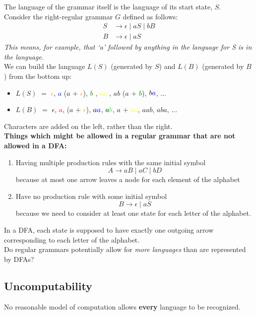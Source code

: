 \documentclass[11pt]{article}
\newcommand{\ex}[0]{\tcbhighmath[boxrule=0.5mm, colframe=pink, colback=pink, arc=10mm, size=fbox]{\textbf{Ex:}}}
\newcommand{\thm}[0]{\tcbhighmath[boxrule=0.5mm, colframe=orange!20, colback=orange!20, arc=10mm, size=fbox]{\textbf{Thm:}}}
\begin{document}
The language of the grammar itself is the language of its start state, $S$.\\

\ex Consider the right-regular grammar $G$ defined as follows:
$$
\begin{aligned}
  S &\to \epsilon \mid a S \mid b B \\
  B &\to \epsilon \mid a S
\end{aligned}
$$
\small{}\textit{This means, for example, that `a' followed by anything in the language for S is in the language.}\\  
\normalsize{}
We can build the language $L(S)$ (generated by $S$) and $L(B)$ (generated by $B$) from the bottom up:
\begin{itemize}[itemsep=-2pt]\setlength{\baselineskip}{10pt}
  \item $L(S)$ $=$ \textcolor{orange}{$\epsilon$}, \textcolor{blue}{$a$} ($a$ $+$ \textcolor{orange}{$\epsilon$}), \textcolor{green}{$b$} , \textcolor{yellow}{$aa$} , $ab$ ($a$ $+$ \textcolor{green}{$b$}), $b \textcolor{blue}{a}$, $\dots$
  \item $L(B)$ $=$ $\epsilon$, \textcolor{red}{$a$}, ($a$ $+$ \textcolor{orange}{$\epsilon$}), $a \textcolor{blue}{a}$, $a \textcolor{green}{b}$, $a$ $+$ \textcolor{yellow}{$aa$}, $aab$, $aba$, $\dots$
\end{itemize}
Characters are added on the left, rather than the right. \\

\textbf{Things which might be allowed in a regular grammar that are not allowed in a DFA:}
\begin{enumerate}
  \item Having multiple production rules with the same initial symbol
  $$
  A \to aB \mid aC \mid bD
  $$
  because at most one arrow leaves a node for each element of the alphabet
  \item Have no production rule with some initial symbol
  $$
  B \to \epsilon \mid aS
  $$
  because we need to consider at least one state for each letter of the alphabet.
\end{enumerate}
In a DFA, each state is supposed to have exactly one outgoing arrow corresponding to each letter of the alphabet.
\\ Do regular grammars potentially allow for \textit{more languages} than are represented by DFAs?


\subsection{Uncomputability}
\thm No reasonable model of computation allows \textbf{every} language to be recognized.\\
\end{document}
